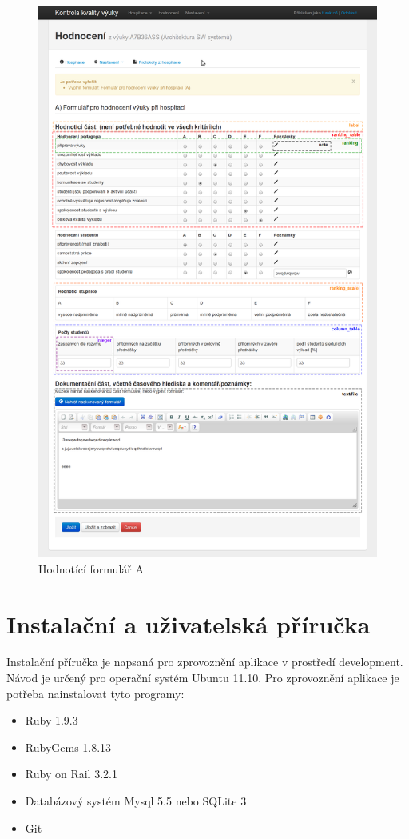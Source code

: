 \begin{figure}[H]
\begin{center}
\includegraphics[width=14cm]{figures/form_A}
\caption{Hodnotící formulář A}
\label{fig:form_a}
\end{center}
\end{figure}

\chapter{Instalační a uživatelská příručka}
Instalační příručka je napsaná pro zprovoznění aplikace v prostředí development. Návod je určený pro operační systém Ubuntu 11.10. Pro zprovoznění aplikace je potřeba nainstalovat tyto programy:
\begin{itemize}
\item Ruby 1.9.3
\item RubyGems 1.8.13
\item Ruby on Rail 3.2.1
\item Databázový systém Mysql 5.5 nebo SQLite 3
\item Git
\end{itemize}


